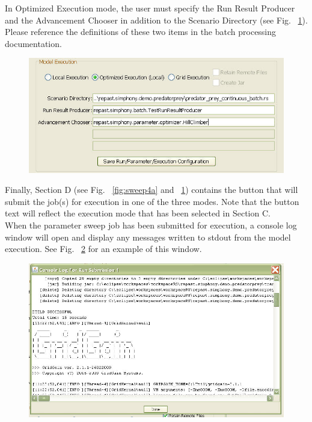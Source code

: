 \documentclass[11pt]{amsart}
\begin{document}
In Optimized Execution mode, the user must specify the Run Result Producer and the Advancement Chooser in addition to the Scenario Directory (see Fig. ~\ref{fig:sweep4b}). Please reference the definitions of these two items in the batch processing documentation.\\

\begin{figure}[h]
\begin{center}
\vspace{.2in}
\centerline {
\includegraphics{images/sweep4b.jpg}
}
\caption{}
\label{fig:sweep4b}
\end{center}
\end{figure}



Finally, Section D (see Fig. ~\ref{fig:sweep4a} and ~\ref{fig:sweep4b}) contains the button that will submit the job(s) for execution in one of the three modes. Note that the button text will reflect the execution mode that has been selected in Section C.\\



When the parameter sweep job has been submitted for execution, a console log window will open and display any messages written to stdout from the model execution. See  Fig. ~\ref{fig:sweep6} for an example of this window.


\begin{figure}[h]
\begin{center}
\vspace{.2in}
\centerline {
\includegraphics{images/sweep6.jpg}
}
\caption{}
\label{fig:sweep6}
\end{center}
\end{figure}
\end{document}
